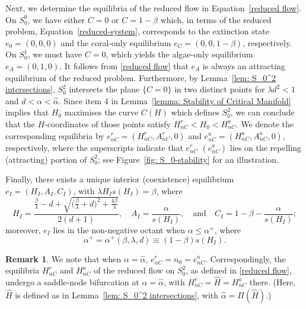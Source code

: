 \documentclass{article}
\theoremstyle{definition}
\numberwithin{equation}{section}
\newtheorem{remark}[prop]{Remark}
\begin{document}
Next, we determine the equilibria of the reduced flow in Equation~\eqref{reduced flow}.
On $S_0^0$, we have either $C=0$ or $C=1-\beta$ which, in terms of the reduced problem, Equation~\eqref{reduced-system}, corresponds to the extinction state $e_0=(0,0,0)$ and the coral-only equilibrium $e_C=(0,0,1-\beta)$, respectively. On $S_0^1$, we must have $C=0$, which yields the algae-only equilibrium $e_A=(0,1,0)$. It follows from \eqref{reduced flow} that $e_A$ is always an attracting equilibrium of the reduced problem.
Furthermore, by Lemma~\ref{lem: S_0^2 intersections}, $S_0^2$ intersects the plane $\{C=0\}$ in two distinct points for $\lambda d^2<1$ and $d<\alpha<\hat{\alpha}$. Since item 4 in Lemma~\ref{lemma: Stability of Critical Manifold} implies that $H_0$ maximises the curve $C(H)$ which defines $S_0^2$, we can conclude that the $H$-coordinates of those points satisfy $H_{nC}^r<H_0<H_{nC}^a$. We denote the corresponding equilibria by $e_{nC}^r=(H_{nC}^r, A_{nC}^r, 0)$ and $e_{nC}^a=(H_{nC}^a, A_{nC}^a, 0)$, respectively, where the superscripts indicate that $e_{nC}^r$ $(e_{nC}^a)$ lies on the repelling (attracting) portion of $S_0^2$; see Figure~\ref{fig: S_0-stability} for an illustration.

Finally, there exists a unique interior (coexistence) equilibrium $e_I=(H_I, A_I, C_I)$, with $\lambda H_Is(H_I)=\beta$, where
\begin{equation}
    H_I = \frac{\frac{\beta}{\lambda}-d+\sqrt{\big(\frac{\beta}{\lambda}+d\big)^2+\frac{4\beta}{\lambda}}}{2(d+1)},\quad
    A_I = \frac{\alpha}{s(H_I)},\quad\text{and}\quad
    C_I = 1-\beta - \frac{\alpha}{s(H_I)};
    \label{eq: coexistence point}
\end{equation}
moreover, $e_I$ lies in the non-negative octant when $\alpha\leq \alpha^+$, where
\begin{equation}
    \alpha^+=\alpha^+(\beta,\lambda,d)\equiv(1-\beta)s(H_I).
    \label{eq: alpha^+}
\end{equation}

\begin{remark}
    We note that when $\alpha=\hat{\alpha}$, $e_{nC}^r=n_0=e_{nC}^a$. Correspondingly, the equilibria $H_{nC}^r$ and $H_{nC}^a$ of the reduced flow on $S_0^2$, as defined in \eqref{reduced flow}, undergo a saddle-node bifurcation at $\alpha=\hat{\alpha}$, with $H_{nC}^r=\hat{H}=H_{nC}^a$ there. (Here, $\hat{H}$ is defined as in Lemma~\ref{lem: S_0^2 intersections}, with $\hat{\alpha}=\Pi(\hat{H})$.)
\end{remark}
\end{document}
